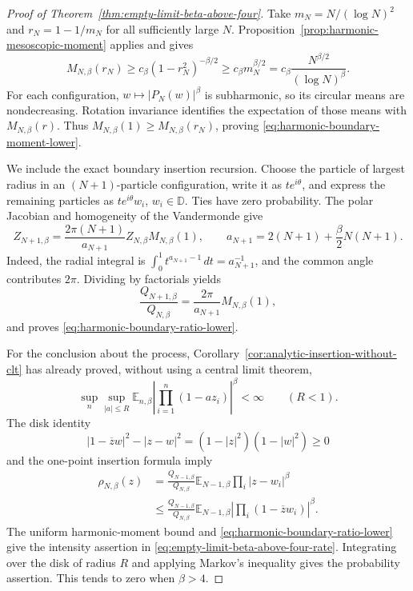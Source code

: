 \documentclass[11pt,a4paper]{article}
\numberwithin{equation}{section}
\theoremstyle{definition}
\theoremstyle{remark}
\begin{document}
\begin{proof}[Proof of Theorem~\ref{thm:empty-limit-beta-above-four}]
Take $m_N=N/(\log N)^2$ and $r_N=1-1/m_N$ for all sufficiently large
$N$. Proposition~\ref{prop:harmonic-mesoscopic-moment} applies and gives
\[
 M_{N,\beta}(r_N)
 \geq c_\beta(1-r_N^2)^{-\beta/2}
 \geq c_\beta m_N^{\beta/2}
 =c_\beta\frac{N^{\beta/2}}{(\log N)^\beta}.
\]
For each configuration, $w\mapsto|P_N(w)|^\beta$ is subharmonic, so
its circular means are nondecreasing. Rotation invariance identifies
the expectation of those means with $M_{N,\beta}(r)$. Thus
$M_{N,\beta}(1)\geq M_{N,\beta}(r_N)$, proving
\eqref{eq:harmonic-boundary-moment-lower}.

We include the exact boundary insertion recursion. Choose the particle
of largest radius in an $(N+1)$-particle configuration, write it as
$te^{i\theta}$, and express the remaining particles as
$te^{i\theta}w_i$, $w_i\in\mathbb D$. Ties have zero probability.
The polar Jacobian and homogeneity of the Vandermonde give
\[
 Z_{N+1,\beta}
 =\frac{2\pi(N+1)}{a_{N+1}}Z_{N,\beta}M_{N,\beta}(1),
 \qquad a_{N+1}=2(N+1)+\frac\beta2N(N+1).
\]
Indeed, the radial integral is
$\int_0^1t^{a_{N+1}-1}\,dt=a_{N+1}^{-1}$, and the common angle
contributes $2\pi$. Dividing by factorials yields
\[
 \frac{Q_{N+1,\beta}}{Q_{N,\beta}}
 =\frac{2\pi}{a_{N+1}}M_{N,\beta}(1),
\]
and proves \eqref{eq:harmonic-boundary-ratio-lower}.

For the conclusion about the process,
Corollary~\ref{cor:analytic-insertion-without-clt} has already proved,
without using a central limit theorem,
\[
 \sup_n\sup_{|a|\leq R}
 \mathbb E_{n,\beta}\left|\prod_{i=1}^n(1-a z_i)\right|^\beta
 <\infty\qquad(R<1).
\]
The disk identity
\[
 |1-\overline z w|^2-|z-w|^2
 =(1-|z|^2)(1-|w|^2)\geq0
\]
and the one-point insertion formula imply
\begin{align*}
 \rho_{N,\beta}(z)
 &=\frac{Q_{N-1,\beta}}{Q_{N,\beta}}
       \mathbb E_{N-1,\beta}\prod_i|z-w_i|^\beta\\
 &\leq\frac{Q_{N-1,\beta}}{Q_{N,\beta}}
       \mathbb E_{N-1,\beta}
          \left|\prod_i(1-\overline z w_i)\right|^\beta.
\end{align*}
The uniform harmonic-moment bound and
\eqref{eq:harmonic-boundary-ratio-lower} give the intensity assertion in
\eqref{eq:empty-limit-beta-above-four-rate}. Integrating over the disk
of radius $R$ and applying Markov's inequality gives the probability
assertion. This tends to zero when $\beta>4$.


\end{proof}
\end{document}
